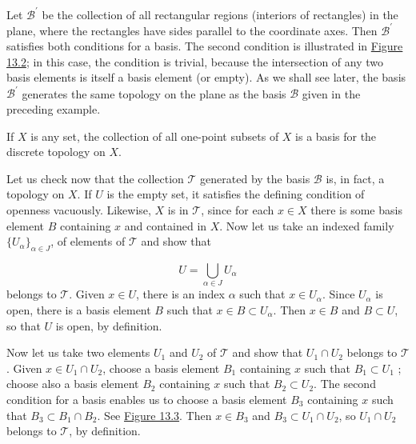 \begin{centeredblock}
 \begin{example}
\label{ex:\thesection.\theexample}
  Let \(\mathcal{B}^{\prime }\) be the collection of all rectangular regions (interiors of rectangles) in the plane, where the rectangles have sides parallel to the coordinate axes. Then \(\mathcal{B}^{\prime }\) satisfies both conditions for a basis. The second condition is illustrated in \hyperref[fig:13.2]{Figure 13.2}; in this case, the condition is trivial, because the intersection of any two basis elements is itself a basis element (or empty). As we shall see later, the basis \(\mathcal{B}^{\prime }\) generates the same topology on the plane as the basis \(\mathcal{B}\) given in the preceding example.
 \end{example}
\end{centeredblock}

\begin{centeredblock}
 \begin{example}
\label{ex:\thesection.\theexample}
  If \(X\) is any set, the collection of all one-point subsets of \(X\) is a basis for the discrete topology on \(X\).
 \end{example}
\end{centeredblock}

Let us check now that the collection \(\mathcal{T}\) generated by the basis \(\mathcal{B}\) is, in fact, a topology on \(X\). If \(U\) is the empty set, it satisfies the defining condition of openness vacuously. Likewise, \(X\) is in \(\mathcal{T}\), since for each \(x \in X\) there is some basis element \(B\) containing \(x\) and contained in \(X\). Now let us take an indexed family \({\{ U_{\alpha }\} }_{\alpha \in J}\), of elements of \(\mathcal{T}\) and show that

\[
U = \mathop{\bigcup }\limits_{{\alpha \in J}}U_{\alpha }
\]
belongs to \(\mathcal{T}\). Given \(x \in U\), there is an index \(\alpha\) such that \(x \in {U}_{\alpha }\). Since \(U_{\alpha }\) is open, there is a basis element \(B\) such that \(x \in B \subset {U}_{\alpha }\). Then \(x \in B\) and \(B \subset U\), so that \(U\) is open, by definition.

Now let us take two elements \(U_{1}\) and \(U_{2}\) of \(\mathcal{T}\) and show that \(U_{1} \cap {U}_{2}\) belongs to \(\mathcal{T}\). Given \(x \in {U}_{1} \cap {U}_{2}\), choose a basis element \(B_{1}\) containing \(x\) such that \(B_{1} \subset {U}_{1}\) ; choose also a basis element \(B_{2}\) containing \(x\) such that \(B_{2} \subset {U}_{2}\). The second condition for a basis enables us to choose a basis element \(B_{3}\) containing \(x\) such that \(B_{3} \subset {B}_{1} \cap {B}_{2}\). See \hyperref[fig:13.3]{Figure 13.3}. Then \(x \in {B}_{3}\) and \(B_{3} \subset {U}_{1} \cap {U}_{2}\), so \(U_{1} \cap {U}_{2}\) belongs to \(\mathcal{T}\), by definition.

